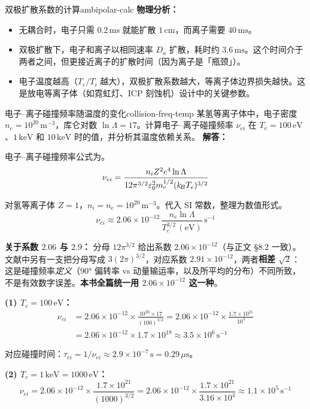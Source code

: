 \begin{example}{双极扩散系数的计算}{ambipolar-calc}
\textbf{物理分析：}
\begin{itemize}[leftmargin=*,itemsep=0pt]
\item 无耦合时，电子只需 $0.2\,\mathrm{ms}$ 就能扩散 $1\,\mathrm{cm}$，而离子需要 $40\,\mathrm{ms}$。
\item 双极扩散下，电子和离子以相同速率 $D_a$ 扩散，耗时约 $3.6\,\mathrm{ms}$。这个时间介于两者之间，但更接近离子的扩散时间（因为离子是「瓶颈」）。
\item 电子温度越高（$T_e/T_i$ 越大），双极扩散系数越大，等离子体边界损失越快。这是放电等离子体（如霓虹灯、ICP 刻蚀机）设计中的关键参数。
\end{itemize}
\end{example}

\begin{example}{电子--离子碰撞频率随温度的变化}{collision-freq-temp}
某氢等离子体中，电子密度 $n_e = 10^{20}\,\mathrm{m}^{-3}$，库仑对数 $\ln\Lambda = 17$。计算电子--离子碰撞频率 $\nu_{ei}$ 在 $T_e = 100\,\mathrm{eV}$、$1\,\mathrm{keV}$ 和 $10\,\mathrm{keV}$ 时的值，并分析其温度依赖关系。
\tcblower
\textbf{解答：}

电子--离子碰撞频率公式为。
\[
\nu_{ei} = \frac{n_i Z^2 e^4 \ln\Lambda}{12\pi^{3/2}\varepsilon_0^2 m_e^{1/2}(k_{\!B}T_e)^{3/2}}
\]

对氢等离子体 $Z=1$，$n_i = n_e = 10^{20}\,\mathrm{m}^{-3}$。代入 SI 常数，整理为数值形式。
\[
\nu_{ei} \approx 2.06\times 10^{-12}\,\frac{n_e\ln\Lambda}{T_e^{3/2}\,\mathrm{(eV)}}\,\mathrm{s}^{-1}
\]

\textbf{关于系数 $2.06$ 与 $2.9$：} 分母 $12\pi^{3/2}$ 给出系数 $2.06\times10^{-12}$（与正文 \S 8.2 一致）。文献中另有一支把分母写成 $3(2\pi)^{3/2}$，对应系数 $2.91\times10^{-12}$，两者\textbf{相差 $\sqrt2$}：这是碰撞频率\emph{定义}（90° 偏转率 vs 动量输运率，以及所平均的分布）不同所致，不是有效数字误差。\textbf{本书全篇统一用 $2.06\times10^{-12}$ 这一种}。

\textbf{(1) $T_e = 100\,\mathrm{eV}$：}
\[
\begin{aligned}
\nu_{ei} &= 2.06\times 10^{-12}\times\frac{10^{20}\times 17}{(100)^{3/2}}
= 2.06\times 10^{-12}\times\frac{1.7\times 10^{21}}{10^3}\\
&= 2.06\times 10^{-12}\times 1.7\times 10^{18}
\approx 3.5\times 10^{6}\,\mathrm{s}^{-1}
\end{aligned}
\]

对应碰撞时间：$\tau_{ei} = 1/\nu_{ei} \approx 2.9\times 10^{-7}\,\mathrm{s} = 0.29\,\mu\mathrm{s}$。

\textbf{(2) $T_e = 1\,\mathrm{keV} = 1000\,\mathrm{eV}$：}
\[
\nu_{ei} = 2.06\times 10^{-12}\times\frac{1.7\times 10^{21}}{(1000)^{3/2}}
= 2.06\times 10^{-12}\times\frac{1.7\times 10^{21}}{3.16\times 10^4}
\approx 1.1\times 10^{5}\,\mathrm{s}^{-1}
\]


\end{example}
